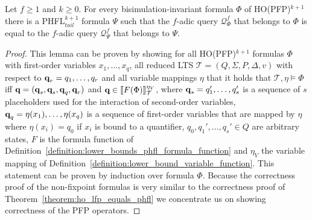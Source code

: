 \begin{lemma}
    \label{lemma:ho_pfp_equals_phfl_tail}
    Let $f \geq 1$ and $k \geq 0$. For every bisimulation-invariant formula $\Phi$ of HO(PFP)$^{k + 1}$ there is a
    PHFL$^{k+1}_{tail}$ formula $\Psi$ such that the $f$-adic query $\mathcal{Q}_\Phi^f$ that belongs to $\Phi$ is equal to the $f$-adic query  $\mathcal{Q}_\Psi^f$ that belongs to $\Psi$.
\end{lemma}

\begin{proof}
    This lemma can be proven by showing for all HO(PFP)$^{k+1}$ formulas $\Phi$ with first-order variables $x_1,
    \dots, x_q$, all reduced LTS $\mathcal{T} = (Q, \Sigma, P,
    \Delta, v)$ with respect to $\emph{q}_r = q_1, \dots, q_r$ and all variable mappings $\eta$ that it holds that $\mathcal{T}, \eta \models \Phi$ iff $\emph{q} =
    (\emph{q}_s, \emph{q}_s, \emph{q}_q, \emph{q}_r)$ and $\emph{q} \in \llbracket
   F(\Phi)\rrbracket^{\eta_V}_{\mathcal{T}}$, where $\emph{q}_s = q_1',\dots,q_s'$ is a sequence of $s$ placeholders used for the interaction of second-order variables, $\emph{q}_q = \eta(x_1), \dots, \eta(x_q)$ is a sequence of first-order variables that are mapped by $\eta$ where $\eta(x_i) = q_0$ if $x_i$ is bound to a quantifier, $q_0, q_1', \dots, q_s' \in Q$ are arbitrary states, $F$ is the formula function of
    Definition~\ref{definition:lower_bounds_phfl_formula_function} and $\eta_V$ the variable mapping of
    Definition~\ref{definition:lower_bound_variable_function}. This statement can be proven by induction over formula
    $\Phi$.
    Because the correctness proof of the non-fixpoint formulas is very similar to the correctness proof of Theorem~\ref{theorem:ho_lfp_equals_phfl} we concentrate us on showing correctness of the PFP operators.
\end{proof}
